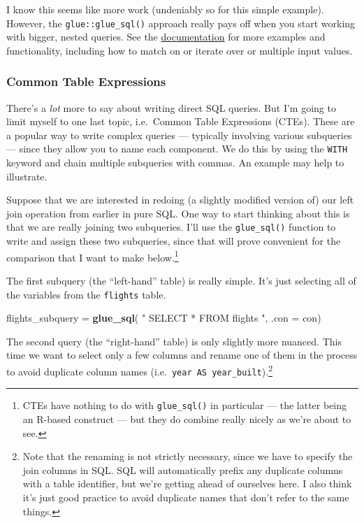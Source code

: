 \documentclass[
]{article}
\newenvironment{Shaded}{\begin{snugshade}}{\end{snugshade}}
\newcommand{\AttributeTok}[1]{\textcolor[rgb]{0.13,0.29,0.53}{#1}}
\newcommand{\FunctionTok}[1]{\textcolor[rgb]{0.13,0.29,0.53}{\textbf{#1}}}
\newcommand{\NormalTok}[1]{#1}
\newcommand{\OtherTok}[1]{\textcolor[rgb]{0.56,0.35,0.01}{#1}}
\newcommand{\StringTok}[1]{\textcolor[rgb]{0.31,0.60,0.02}{#1}}
\begin{document}
I know this seems like more work (undeniably so for this simple
example). However, the \texttt{glue::glue\_sql()} approach really pays
off when you start working with bigger, nested queries. See the
\href{https://glue.tidyverse.org/reference/glue_sql.html}{documentation}
for more examples and functionality, including how to match on or
iterate over or multiple input values.

\hypertarget{common-table-expressions}{%
\subsubsection{Common Table
Expressions}\label{common-table-expressions}}

There's a \emph{lot} more to say about writing direct SQL queries. But
I'm going to limit myself to one last topic, i.e.~Common Table
Expressions (CTEs). These are a popular way to write complex queries ---
typically involving various subqueries --- since they allow you to name
each component. We do this by using the \texttt{WITH} keyword and chain
multiple subqueries with commas. An example may help to illustrate.

Suppose that we are interested in redoing (a slightly modified version
of) our left join operation from earlier in pure SQL. One way to start
thinking about this is that we are really joining two subqueries. I'll
use the \texttt{glue\_sql()} function to write and assign these two
subqueries, since that will prove convenient for the comparison that I
want to make below.\footnote{CTEs have nothing to do with
  \texttt{glue\_sql()} in particular --- the latter being an R-based
  construct --- but they do combine really nicely as we're about to see.}

The first subquery (the ``left-hand'' table) is really simple. It's just
selecting all of the variables from the \texttt{flights} table.

\begin{Shaded}
\begin{Highlighting}[]
\NormalTok{flights\_subquery }\OtherTok{=} 
  \FunctionTok{glue\_sql}\NormalTok{(}
    \StringTok{"}
\StringTok{    SELECT * }
\StringTok{    FROM flights}
\StringTok{    "}\NormalTok{, }
    \AttributeTok{.con =}\NormalTok{ con)}
\end{Highlighting}
\end{Shaded}

The second query (the ``right-hand'' table) is only slightly more
nuanced. This time we want to select only a few columns and rename one
of them in the process to avoid duplicate column names
(i.e.~\texttt{year\ AS\ year\_built}).\footnote{Note that the renaming
  is not strictly necessary, since we have to specify the join columns
  in SQL. SQL will automatically prefix any duplicate columns with a
  table identifier, but we're getting ahead of ourselves here. I also
  think it's just good practice to avoid duplicate names that don't
  refer to the same things.}
\end{document}
